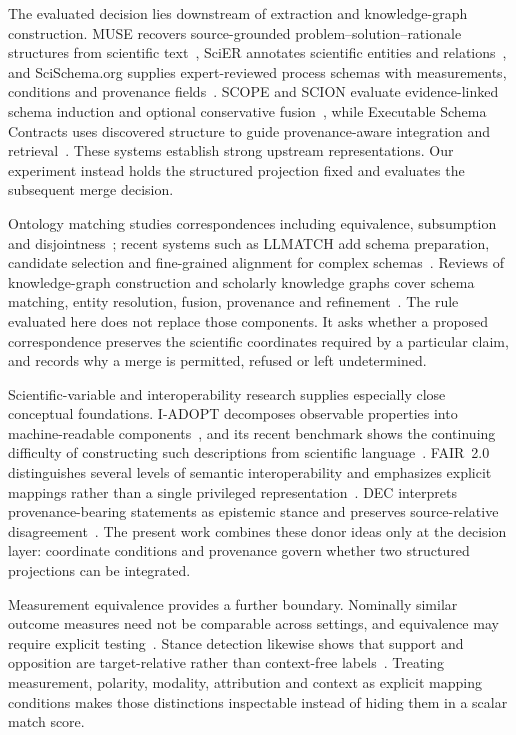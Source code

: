 The evaluated decision lies downstream of extraction and knowledge-graph
construction. MUSE recovers source-grounded problem--solution--rationale
structures from scientific text~\cite{muse2026}, SciER annotates scientific
entities and relations~\cite{scier2024}, and SciSchema.org supplies
expert-reviewed process schemas with measurements, conditions and provenance
fields~\cite{scischema2026}. SCOPE and SCION evaluate evidence-linked schema
induction and optional conservative fusion~\cite{scopes2026}, while Executable
Schema Contracts uses discovered structure to guide provenance-aware
integration and retrieval~\cite{schemaContracts2026}. These systems establish
strong upstream representations. Our experiment instead holds the structured
projection fixed and evaluates the subsequent merge decision.

Ontology matching studies correspondences including equivalence, subsumption
and disjointness~\cite{euzenat2007ontology}; recent systems such as LLMATCH add
schema preparation, candidate selection and fine-grained alignment for complex
schemas~\cite{llmatch2025}. Reviews of knowledge-graph construction and
scholarly knowledge graphs cover schema matching, entity resolution, fusion,
provenance and refinement~\cite{hofer2024kgconstruction, verma2023scholarlykg}.
The rule evaluated here does not replace those components. It asks whether a
proposed correspondence preserves the scientific coordinates required by a
particular claim, and records why a merge is permitted, refused or left
undetermined.

Scientific-variable and interoperability research supplies especially close
conceptual foundations. I-ADOPT decomposes observable properties into
machine-readable components~\cite{iadopt2021}, and its recent benchmark shows
the continuing difficulty of constructing such descriptions from scientific
language~\cite{iadoptbench2026}. FAIR~2.0 distinguishes several levels of
semantic interoperability and emphasizes explicit mappings rather than a
single privileged representation~\cite{fair2_2024}. DEC interprets
provenance-bearing statements as epistemic stance and preserves
source-relative disagreement~\cite{dec2026}. The present work combines these
donor ideas only at the decision layer: coordinate conditions and provenance
govern whether two structured projections can be integrated.

Measurement equivalence provides a further boundary. Nominally similar outcome
measures need not be comparable across settings, and equivalence may require
explicit testing~\cite{jilke2017measurement}. Stance detection likewise shows
that support and opposition are target-relative rather than context-free
labels~\cite{hardalov2022stance}. Treating measurement, polarity, modality,
attribution and context as explicit mapping conditions makes those distinctions
inspectable instead of hiding them in a scalar match score.

